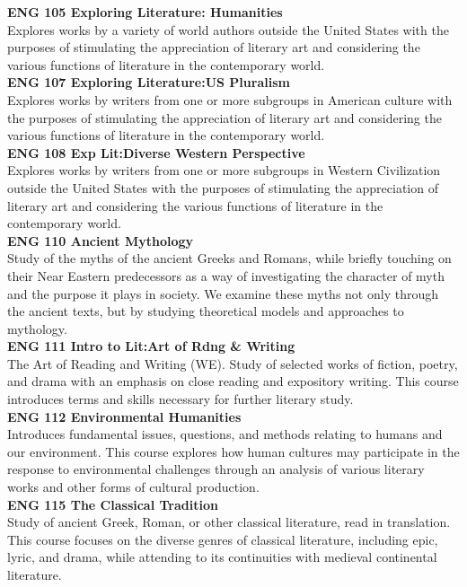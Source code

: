 \documentclass[
  letterpaper,
]{scrbook}
\begin{document}
\textbf{ENG 105 Exploring Literature: Humanities}\\
Explores works by a variety of world authors outside the United States
with the purposes of stimulating the appreciation of literary art and
considering the various functions of literature in the contemporary
world.\\
\textbf{ENG 107 Exploring Literature:US Pluralism}\\
Explores works by writers from one or more subgroups in American culture
with the purposes of stimulating the appreciation of literary art and
considering the various functions of literature in the contemporary
world.\\
\textbf{ENG 108 Exp Lit:Diverse Western Perspective}\\
Explores works by writers from one or more subgroups in Western
Civilization outside the United States with the purposes of stimulating
the appreciation of literary art and considering the various functions
of literature in the contemporary world.\\
\textbf{ENG 110 Ancient Mythology}\\
Study of the myths of the ancient Greeks and Romans, while briefly
touching on their Near Eastern predecessors as a way of investigating
the character of myth and the purpose it plays in society. We examine
these myths not only through the ancient texts, but by studying
theoretical models and approaches to mythology.\\
\textbf{ENG 111 Intro to Lit:Art of Rdng \& Writing}\\
The Art of Reading and Writing (WE). Study of selected works of fiction,
poetry, and drama with an emphasis on close reading and expository
writing. This course introduces terms and skills necessary for further
literary study.\\
\textbf{ENG 112 Environmental Humanities}\\
Introduces fundamental issues, questions, and methods relating to humans
and our environment. This course explores how human cultures may
participate in the response to environmental challenges through an
analysis of various literary works and other forms of cultural
production.\\
\textbf{ENG 115 The Classical Tradition}\\
Study of ancient Greek, Roman, or other classical literature, read in
translation. This course focuses on the diverse genres of classical
literature, including epic, lyric, and drama, while attending to its
continuities with medieval continental literature.\\
\end{document}

